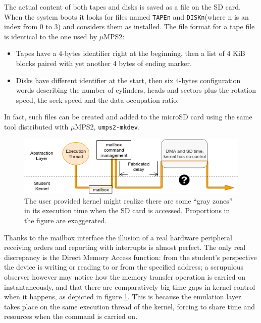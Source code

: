 \documentclass[12pt,a4paper,openright,twoside]{report}
\begin{document}
The actual content of both tapes and disks is saved as a file on the SD card. When the system 
boots it looks for files named {\tt TAPEn} and {\tt DISKn}(where n is an index from 0 to 
3) and considers them as installed. 
The file format for a tape file is identical to the one used by $\mu$MPS2: 
\begin{itemize}
    \item Tapes have a 4-bytes identifier right at the beginning, then 
        a list of 4 KiB blocks paired with yet another 4 bytes of ending marker.
    \item Disks have different identifier at the start, then six 4-bytes configuration
        words describing the number of cylinders, heads and sectors plus the rotation
        speed, the seek speed and the data occupation ratio.
\end{itemize}
In fact, such files can be created and added to the microSD card using the same tool
distributed with $\mu$MPS2, {\tt umps2-mkdev}.

 \begin{figure}[t]
    \begin{center}
 \includegraphics[scale=0.65]{images/tesi13.png}
 \caption[Execution thread]{The user provided kernel might realize there are some
 ``gray zones'' in its execution time when the SD card is accessed. Proportions
 in the figure are exaggerated.}
 \label{fig:executionthread}
    \end{center}
 \end{figure}

Thanks to the mailbox interface the illusion of a real hardware peripheral receiving
orders and reporting with interrupts is almost perfect. The only real discrepancy
is the Direct Memory Access function: from the student's perspective the device
is writing or reading to or from the specified address; a scrupulous observer
however may notice how the memory transfer operation is carried on instantaneously,
and that there are comparatively big time gaps in kernel control when it happens,
as depicted in figure \ref{fig:executionthread}.
This is because the emulation layer takes place on the same execution thread of
the kernel, forcing to share time and resources when the command is carried on.
\end{document}

